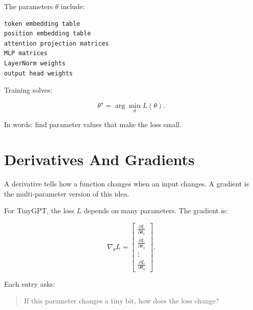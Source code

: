 The parameters \(\theta\) include:

\begin{lstlisting}
token embedding table
position embedding table
attention projection matrices
MLP matrices
LayerNorm weights
output head weights
\end{lstlisting}

\begin{center}
\end{center}

Training solves:

\[
\theta^\star = \arg\min_{\theta} L(\theta).
\]

In words: find parameter values that make the loss small.

\section{Derivatives And Gradients}

A derivative tells how a function changes when an input changes. A gradient is the multi-parameter version of this idea.

For TinyGPT, the loss \(L\) depends on many parameters. The gradient is:

\[
\nabla_\theta L =
\begin{bmatrix}
\frac{\partial L}{\partial \theta_1}\\
\frac{\partial L}{\partial \theta_2}\\
\vdots\\
\frac{\partial L}{\partial \theta_n}
\end{bmatrix}.
\]

Each entry asks:

\begin{quote}
If this parameter changes a tiny bit, how does the loss change?
\end{quote}

